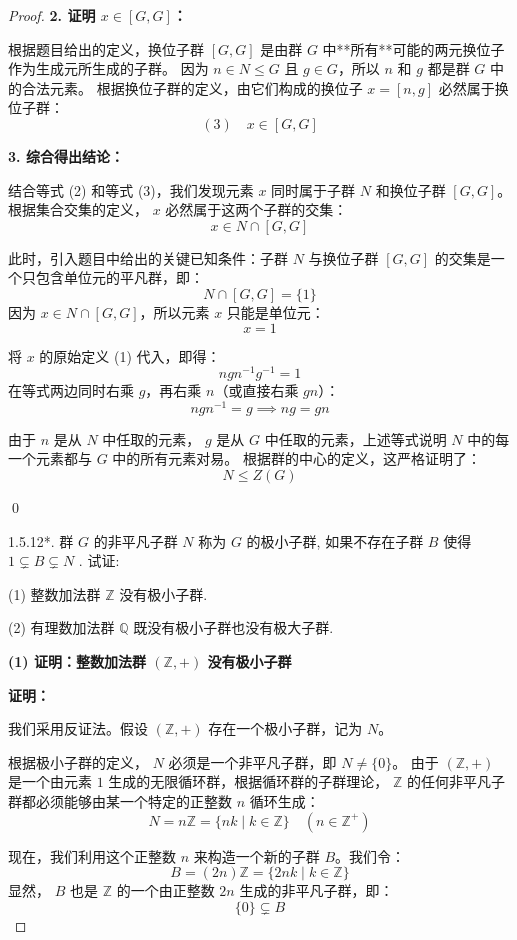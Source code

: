 \documentclass[]{article}
\begin{document}
\begin{proof}
\bigskip
\noindent \textbf{2. 证明 $x \in [G, G]$：}

根据题目给出的定义，换位子群 $[G, G]$ 是由群 $G$ 中**所有**可能的两元换位子作为生成元所生成的子群。
因为 $n \in N \leqslant G$ 且 $g \in G$，所以 $n$ 和 $g$ 都是群 $G$ 中的合法元素。
根据换位子群的定义，由它们构成的换位子 $x = [n, g]$ 必然属于换位子群：
\[ (3) \quad x \in [G, G] \]

\bigskip
\noindent \textbf{3. 综合得出结论：}

结合等式 (2) 和等式 (3)，我们发现元素 $x$ 同时属于子群 $N$ 和换位子群 $[G, G]$。根据集合交集的定义， $x$ 必然属于这两个子群的交集：
\[ x \in N \cap [G, G] \]

此时，引入题目中给出的关键已知条件：子群 $N$ 与换位子群 $[G, G]$ 的交集是一个只包含单位元的平凡群，即：
\[ N \cap [G, G] = \{1\} \]
因为 $x \in N \cap [G, G]$，所以元素 $x$ 只能是单位元：
\[ x = 1 \]

将 $x$ 的原始定义 (1) 代入，即得：
\[ n g n^{-1} g^{-1} = 1 \]
在等式两边同时右乘 $g$，再右乘 $n$（或直接右乘 $gn$）：
\[ n g n^{-1} = g \implies ng = gn \]

由于 $n$ 是从 $N$ 中任取的元素， $g$ 是从 $G$ 中任取的元素，上述等式说明 $N$ 中的每一个元素都与 $G$ 中的所有元素对易。
根据群的中心的定义，这严格证明了：
\[ N \leqslant Z(G) \]

\qed

1.5.12*. 群 $G$ 的非平凡子群 $N$ 称为 $G$ 的极小子群, 如果不存在子群 $B$ 使得 $1 \subsetneq B \subsetneq N$ . 试证: 

(1) 整数加法群 $\mathbb{Z}$ 没有极小子群. 

(2) 有理数加法群 $\mathbb{Q}$ 既没有极小子群也没有极大子群. 

\bigskip
\noindent \textbf{(1) 证明：整数加法群 $(\mathbb{Z}, +)$ 没有极小子群}

\medskip
\noindent \textbf{证明：}

我们采用反证法。假设 $(\mathbb{Z}, +)$ 存在一个极小子群，记为 $N$。

根据极小子群的定义， $N$ 必须是一个非平凡子群，即 $N \neq \{0\}$。
由于 $(\mathbb{Z}, +)$ 是一个由元素 $1$ 生成的无限循环群，根据循环群的子群理论， $\mathbb{Z}$ 的任何非平凡子群都必须能够由某一个特定的正整数 $n$ 循环生成：
\[ N = n\mathbb{Z} = \{ nk \mid k \in \mathbb{Z} \} \quad (n \in \mathbb{Z}^+) \]

现在，我们利用这个正整数 $n$ 来构造一个新的子群 $B$。我们令：
\[ B = (2n)\mathbb{Z} = \{ 2nk \mid k \in \mathbb{Z} \} \]
显然， $B$ 也是 $\mathbb{Z}$ 的一个由正整数 $2n$ 生成的非平凡子群，即：
\[ \{0\} \subsetneq B \]


\end{proof}
\end{document}
